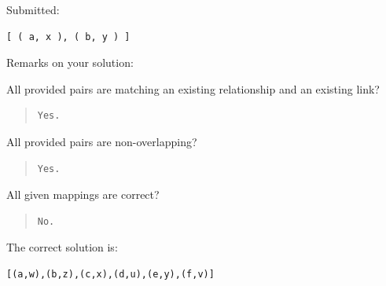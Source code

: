 Submitted:


\begin{verbatim}
[ ( a, x ), ( b, y ) ]
\end{verbatim}


Remarks on your solution:

All provided pairs are matching an existing relationship and an existing link?

\begin{quote}
\begin{verbatim}
Yes.
\end{verbatim}
\end{quote}

All provided pairs are non-overlapping?

\begin{quote}
\begin{verbatim}
Yes.
\end{verbatim}
\end{quote}

All given mappings are correct?

\begin{quote}
\begin{verbatim}
No.
\end{verbatim}
\end{quote}

The correct solution is:
\begin{verbatim}
[(a,w),(b,z),(c,x),(d,u),(e,y),(f,v)]
\end{verbatim}



